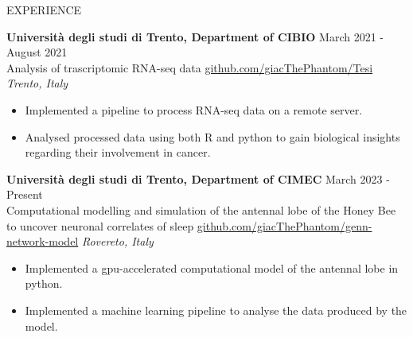 \documentclass{resume} %
\begin{document}
\begin{rSection}{EXPERIENCE}

\textbf{Universit\`a degli studi di Trento, Department of CIBIO} \hfill March 2021 - August 2021\\
Analysis of trascriptomic RNA-seq data \hfill \href{https://github.com/giacThePhantom/Tesi}{github.com/giacThePhantom/Tesi} \hfill \textit{Trento, Italy}\\
 \begin{itemize}
    \itemsep -3pt {}
     \item Implemented a pipeline to process RNA-seq data on a remote server.
     \item Analysed processed data using both R and python to gain biological insights regarding their involvement in cancer.
 \end{itemize}

\textbf{Universit\`a degli studi di Trento, Department of CIMEC} \hfill March 2023 - Present\\
Computational modelling and simulation of the antennal lobe of the Honey Bee to uncover neuronal correlates of sleep \hfill \href{https://github.com/giacThePhantom/genn-network-model}{github.com/giacThePhantom/genn-network-model} \hfill \textit{Rovereto, Italy}
 \begin{itemize}
    \itemsep -3pt {}
     \item Implemented a gpu-accelerated computational model of the antennal lobe in python.
     \item Implemented a machine learning pipeline to analyse the data produced by the model.
 \end{itemize}

\end{rSection}

\end{document}
